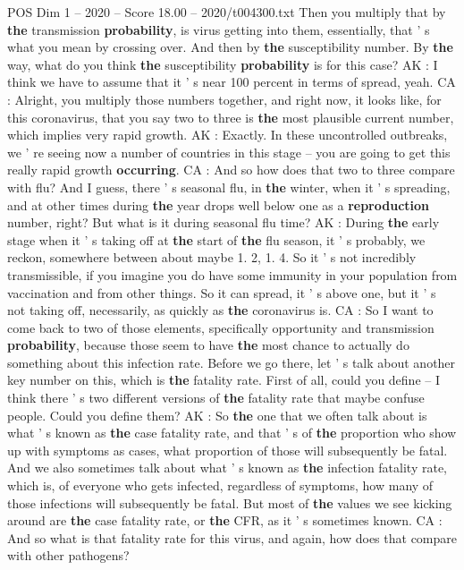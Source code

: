 \begin{textsample}{POS Dim 1 – 2020 – Score 18.00 – 2020/t004300.txt}
Then you multiply that by \textbf{the} transmission \textbf{probability}, is virus getting into them, essentially, that ' s what you mean by crossing over.
And then by \textbf{the} susceptibility number.
By \textbf{the} way, what do you think \textbf{the} susceptibility \textbf{probability} is for this case?
AK : I think we have to assume that it ' s near 100 percent in terms of spread, yeah.
CA : Alright, you multiply those numbers together, and right now, it looks like, for this coronavirus, that you say two to three is \textbf{the} most plausible current number, which implies very rapid growth.
AK : Exactly.
In these uncontrolled outbreaks, we ' re seeing now a number of countries in this stage -- you are going to get this really rapid growth \textbf{occurring}.
CA : And so how does that two to three compare with flu?
And I guess, there ' s seasonal flu, in \textbf{the} winter, when it ' s spreading, and at other times during \textbf{the} year drops well below one as a \textbf{reproduction} number, right?
But what is it during seasonal flu time?
AK : During \textbf{the} early stage when it ' s taking off at \textbf{the} start of \textbf{the} flu season, it ' s probably, we reckon, somewhere between about maybe 1. 2, 1. 4.
So it ' s not incredibly transmissible, if you imagine you do have some immunity in your population from vaccination and from other things.
So it can spread, it ' s above one, but it ' s not taking off, necessarily, as quickly as \textbf{the} coronavirus is.
CA : So I want to come back to two of those elements, specifically opportunity and transmission \textbf{probability}, because those seem to have \textbf{the} most chance to actually do something about this infection rate.
Before we go there, let ' s talk about another key number on this, which is \textbf{the} fatality rate.
First of all, could you define -- I think there ' s two different versions of \textbf{the} fatality rate that maybe confuse people.
Could you define them?
AK : So \textbf{the} one that we often talk about is what ' s known as \textbf{the} case fatality rate, and that ' s of \textbf{the} proportion who show up with symptoms as cases, what proportion of those will subsequently be fatal.
And we also sometimes talk about what ' s known as \textbf{the} infection fatality rate, which is, of everyone who gets infected, regardless of symptoms, how many of those infections will subsequently be fatal.
But most of \textbf{the} values we see kicking around are \textbf{the} case fatality rate, or \textbf{the} CFR, as it ' s sometimes known.
CA : And so what is that fatality rate for this virus, and again, how does that compare with other pathogens?

\end{textsample}
